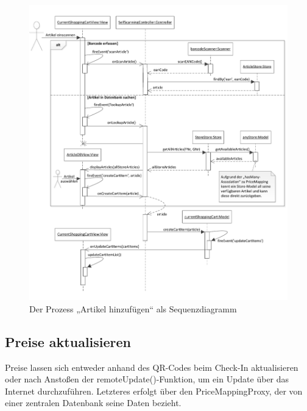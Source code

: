 \begin{figure}[H]
\includegraphics[width=\linewidth]{res/seq_artikel-hinzufuegen.pdf}
\caption{Der Prozess „Artikel hinzufügen“ als Sequenzdiagramm}
\end{figure}

\subsection{Preise aktualisieren}
Preise lassen sich entweder anhand des QR-Codes beim Check-In aktualisieren oder nach Anstoßen der remoteUpdate()-Funktion, um ein Update über das Internet durchzuführen. Letzteres erfolgt über den PriceMappingProxy, der von einer zentralen Datenbank seine Daten bezieht.

